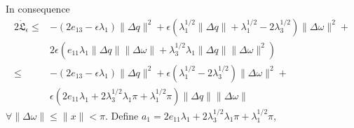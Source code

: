 %
In consequence
%
%
\begin{align}\label{chSMS_ID.eq.AVO_Lyapdot2}
2 \dot{\mathfrak{L}}_\epsilon
   \leq&-\left(2e_{13}-\epsilon\lambda_1\right)\|\Delta q\|^2+
        \epsilon \left(\lambda_1^{1/2}\|\Delta q\|+\lambda_1^{1/2}-
        2\lambda_3^{1/2}\right)\|\Delta \omega\|^2 +
                                                       \nonumber \\
       &2\epsilon(e_{11}\lambda_1\|\Delta q\|\|\Delta\omega\|+
        \lambda_3^{1/2}\lambda_1\|\Delta q\|\|\Delta\omega\|^2)
                                                       \nonumber \\
   \leq&-\left(2e_{13}-\epsilon\lambda_1\right)\|\Delta q\|^2+
        \epsilon (\lambda_1^{1/2}-2\lambda_3^{1/2})\|\Delta \omega\|^2+ 
                                                       \nonumber \\
       &\epsilon(2e_{11}\lambda_1+2\lambda_3^{1/2}\lambda_1\pi+
        \lambda_1^{1/2}\pi)\|\Delta q\|\|\Delta\omega\| 
\end{align}
%
$\forall \|\Delta\omega\|\leq\|x\|<\pi$.   
Define
$a_1=2e_{11}\lambda_1+2\lambda_3^{1/2}\lambda_1\pi+\lambda_1^{1/2}\pi$,
